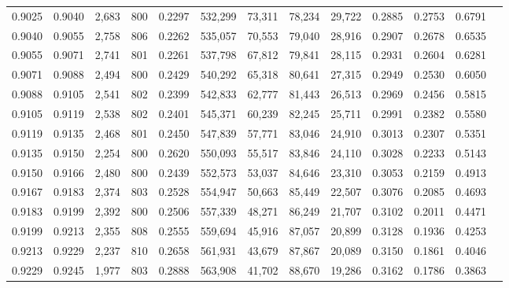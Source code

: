 \begin{tabular}{rrrrrrrrrrrrr}
0.9025 & 0.9040 &  2,683 & 800 &                                     0.2297 & 532,299 &  73,311 &  78,234 &  29,722 & 0.2885 & 0.2753 & 0.6791 \\
0.9040 & 0.9055 &  2,758 & 806 &                                     0.2262 & 535,057 &  70,553 &  79,040 &  28,916 & 0.2907 & 0.2678 & 0.6535 \\
0.9055 & 0.9071 &  2,741 & 801 &                                     0.2261 & 537,798 &  67,812 &  79,841 &  28,115 & 0.2931 & 0.2604 & 0.6281 \\
0.9071 & 0.9088 &  2,494 & 800 &                                     0.2429 & 540,292 &  65,318 &  80,641 &  27,315 & 0.2949 & 0.2530 & 0.6050 \\
0.9088 & 0.9105 &  2,541 & 802 &                                     0.2399 & 542,833 &  62,777 &  81,443 &  26,513 & 0.2969 & 0.2456 & 0.5815 \\
0.9105 & 0.9119 &  2,538 & 802 &                                     0.2401 & 545,371 &  60,239 &  82,245 &  25,711 & 0.2991 & 0.2382 & 0.5580 \\
0.9119 & 0.9135 &  2,468 & 801 &                                     0.2450 & 547,839 &  57,771 &  83,046 &  24,910 & 0.3013 & 0.2307 & 0.5351 \\
0.9135 & 0.9150 &  2,254 & 800 &                                     0.2620 & 550,093 &  55,517 &  83,846 &  24,110 & 0.3028 & 0.2233 & 0.5143 \\
0.9150 & 0.9166 &  2,480 & 800 &                                     0.2439 & 552,573 &  53,037 &  84,646 &  23,310 & 0.3053 & 0.2159 & 0.4913 \\
0.9167 & 0.9183 &  2,374 & 803 &                                     0.2528 & 554,947 &  50,663 &  85,449 &  22,507 & 0.3076 & 0.2085 & 0.4693 \\
0.9183 & 0.9199 &  2,392 & 800 &                                     0.2506 & 557,339 &  48,271 &  86,249 &  21,707 & 0.3102 & 0.2011 & 0.4471 \\
0.9199 & 0.9213 &  2,355 & 808 &                                     0.2555 & 559,694 &  45,916 &  87,057 &  20,899 & 0.3128 & 0.1936 & 0.4253 \\
0.9213 & 0.9229 &  2,237 & 810 &                                     0.2658 & 561,931 &  43,679 &  87,867 &  20,089 & 0.3150 & 0.1861 & 0.4046 \\
0.9229 & 0.9245 &  1,977 & 803 &                                     0.2888 & 563,908 &  41,702 &  88,670 &  19,286 & 0.3162 & 0.1786 & 0.3863 \\

\end{tabular}
